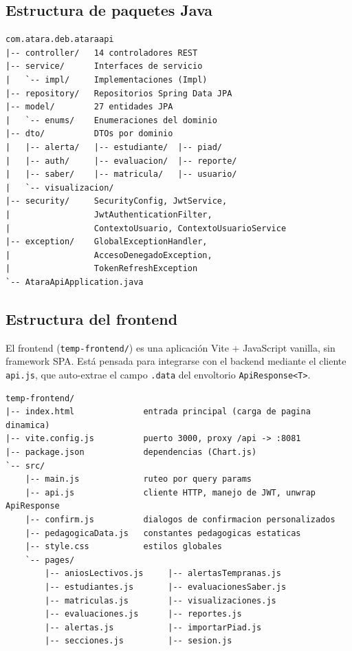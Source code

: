 \documentclass[11pt,a4paper,oneside]{article}
\newcommand{\code}[1]{\texttt{\small #1}}
\begin{document}
\subsection{Estructura de paquetes Java}

\begin{lstlisting}[style=bash,caption={Distribución del código Java}]
com.atara.deb.ataraapi
|-- controller/   14 controladores REST
|-- service/      Interfaces de servicio
|   `-- impl/     Implementaciones (Impl)
|-- repository/   Repositorios Spring Data JPA
|-- model/        27 entidades JPA
|   `-- enums/    Enumeraciones del dominio
|-- dto/          DTOs por dominio
|   |-- alerta/   |-- estudiante/  |-- piad/
|   |-- auth/     |-- evaluacion/  |-- reporte/
|   |-- saber/    |-- matricula/   |-- usuario/
|   `-- visualizacion/
|-- security/     SecurityConfig, JwtService,
|                 JwtAuthenticationFilter,
|                 ContextoUsuario, ContextoUsuarioService
|-- exception/    GlobalExceptionHandler,
|                 AccesoDenegadoException,
|                 TokenRefreshException
`-- AtaraApiApplication.java
\end{lstlisting}

\subsection{Estructura del frontend}

El frontend (\code{temp-frontend/}) es una aplicación Vite + JavaScript vanilla, sin framework
SPA. Está pensada para integrarse con el backend mediante el cliente \code{api.js}, que
auto-extrae el campo \code{.data} del envoltorio \code{ApiResponse<T>}.

\begin{lstlisting}[style=bash,caption={Estructura del frontend Vite}]
temp-frontend/
|-- index.html              entrada principal (carga de pagina dinamica)
|-- vite.config.js          puerto 3000, proxy /api -> :8081
|-- package.json            dependencias (Chart.js)
`-- src/
    |-- main.js             ruteo por query params
    |-- api.js              cliente HTTP, manejo de JWT, unwrap ApiResponse
    |-- confirm.js          dialogos de confirmacion personalizados
    |-- pedagogicaData.js   constantes pedagogicas estaticas
    |-- style.css           estilos globales
    `-- pages/
        |-- aniosLectivos.js     |-- alertasTempranas.js
        |-- estudiantes.js       |-- evaluacionesSaber.js
        |-- matriculas.js        |-- visualizaciones.js
        |-- evaluaciones.js      |-- reportes.js
        |-- alertas.js           |-- importarPiad.js
        |-- secciones.js         |-- sesion.js
\end{lstlisting}
\end{document}
